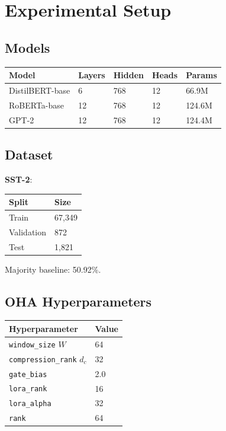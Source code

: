 
\section{Experimental Setup}

\subsection{Models}

\begin{table}[H]
\centering
\small
\begin{tabular}{lllll}
\toprule
\textbf{Model} & \textbf{Layers} & \textbf{Hidden} & \textbf{Heads} & \textbf{Params} \\
\midrule
DistilBERT-base & 6 & 768 & 12 & 66.9M \\
RoBERTa-base & 12 & 768 & 12 & 124.6M \\
GPT-2 & 12 & 768 & 12 & 124.4M \\
\bottomrule
\end{tabular}
\end{table}

\subsection{Dataset}

\textbf{SST-2}:

\begin{table}[H]
\centering
\small
\begin{tabular}{ll}
\toprule
\textbf{Split} & \textbf{Size} \\
\midrule
Train & 67,349 \\
Validation & 872 \\
Test & 1,821 \\
\bottomrule
\end{tabular}
\end{table}

Majority baseline: 50.92\%.

\subsection{OHA Hyperparameters}

\begin{table}[H]
\centering
\small
\begin{tabular}{ll}
\toprule
\textbf{Hyperparameter} & \textbf{Value} \\
\midrule
\texttt{window\_size} $W$ & 64 \\
\texttt{compression\_rank} $d_c$ & 32 \\
\texttt{gate\_bias} & 2.0 \\
\texttt{lora\_rank} & 16 \\
\texttt{lora\_alpha} & 32 \\
\texttt{rank} & 64 \\
\bottomrule
\end{tabular}
\end{table}

